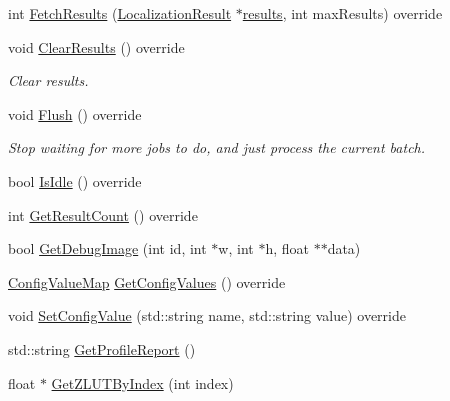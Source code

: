 \begin{DoxyCompactItemize}
int \hyperlink{class_queued_c_p_u_tracker_a8e74a4528a84ac83624d217e62cdef05}{Fetch\+Results} (\hyperlink{struct_localization_result}{Localization\+Result} $\ast$\hyperlink{class_queued_c_p_u_tracker_ad6f5f2d749a7643b727d540a9283d68d}{results}, int max\+Results) override
\item 
void \hyperlink{class_queued_c_p_u_tracker_a24f0731281b361dfb857448ce98d0aa3}{Clear\+Results} () override
\begin{DoxyCompactList}\small\item\em Clear results. \end{DoxyCompactList}\item 
void \hyperlink{class_queued_c_p_u_tracker_a9b332b6fb228e9c655eb2fb12d8dfbc6}{Flush} () override
\begin{DoxyCompactList}\small\item\em Stop waiting for more jobs to do, and just process the current batch. \end{DoxyCompactList}\item 
bool \hyperlink{class_queued_c_p_u_tracker_a16ec7c17782c4f001dec0dab12970cba}{Is\+Idle} () override
\item 
int \hyperlink{class_queued_c_p_u_tracker_a0424c92dec3952cf9197a5a9161e2188}{Get\+Result\+Count} () override
\item 
bool \hyperlink{class_queued_c_p_u_tracker_a4db75a5bfcb5ee2891177da9f6448557}{Get\+Debug\+Image} (int id, int $\ast$w, int $\ast$h, float $\ast$$\ast$data)
\item 
\hyperlink{class_queued_tracker_af6073682cd9e87e6f3e84f93cf9be373}{Config\+Value\+Map} \hyperlink{class_queued_c_p_u_tracker_af06013bc5f92d5570aa6244ca1768fcf}{Get\+Config\+Values} () override
\item 
void \hyperlink{class_queued_c_p_u_tracker_a1d67ecf808b54866d49babb654d32894}{Set\+Config\+Value} (std\+::string name, std\+::string value) override
\item 
std\+::string \hyperlink{class_queued_c_p_u_tracker_a241d002353241975d49c1e80cd967524}{Get\+Profile\+Report} ()
\item 
float $\ast$ \hyperlink{class_queued_c_p_u_tracker_ab467243ae4103dbf2c0b87aa6ba72b3b}{Get\+Z\+L\+U\+T\+By\+Index} (int index)
\end{DoxyCompactItemize}
